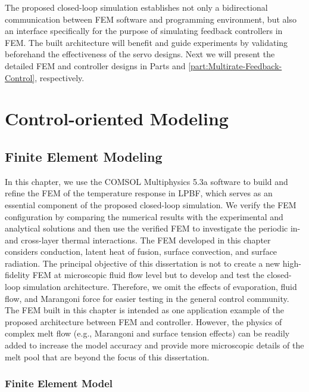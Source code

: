 \documentclass [11pt, proquest] {uwthesis}[2020/02/24]
\begin{document}
The proposed closed-loop simulation establishes not only a bidirectional
communication between FEM software and programming environment, but
also an interface specifically for the purpose of simulating feedback
controllers in FEM. The built architecture will benefit and guide
experiments by validating beforehand the effectiveness of the servo
designs. Next we will present the detailed FEM and controller designs
in Parts \ref{part:Control-oriented Modeling} and \ref{part:Multirate-Feedback-Control},
respectively.


\part{Control-oriented Modeling} \label{part:Control-oriented Modeling}


\chapter{Finite Element Modeling} \label{chap:FEM}

In this chapter, we use the COMSOL Multiphysics 5.3a software to build
and refine the FEM of the temperature response in LPBF, which serves
as an essential component of the proposed closed-loop simulation.
We verify the FEM configuration by comparing the numerical results
with the experimental and analytical solutions and then use the verified FEM to investigate
the periodic in- and cross-layer thermal interactions. The FEM developed
in this chapter considers conduction, latent heat of fusion, surface
convection, and surface radiation. The principal objective of this dissertation is not to create a new high-fidelity FEM at microscopic fluid
flow level but to develop and test the closed-loop simulation architecture.
Therefore, we omit the effects of evaporation, fluid flow, and Marangoni
force for easier testing in the general control community. The FEM
built in this chapter is intended as one application example of the
proposed architecture between FEM and controller. However, the physics
of complex melt flow (e.g., Marangoni and surface tension effects)
can be readily added to increase the model accuracy and provide more
microscopic details of the melt pool that are beyond the focus of
this dissertation.

\section{Finite Element Model} \label{sec:FEM}
\end{document}
